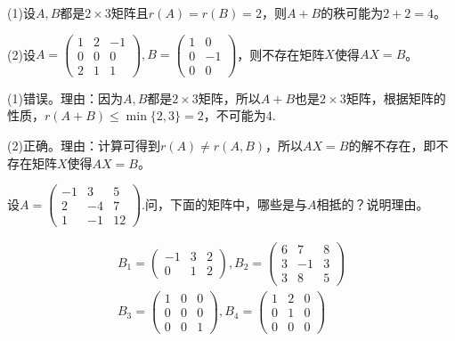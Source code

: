 \documentclass[a4paper]{report}
\begin{document}
(1)设$A,B$都是$2\times3$矩阵且$r(A)=r(B)=2$，则$A+B$的秩可能为$2+2=4$。

(2)设$A=
\begin{pmatrix}
1&2&-1\\
0&0&0\\
2&1&1
\end{pmatrix},B=
\begin{pmatrix}
1&0\\
0&-1\\
0&0
\end{pmatrix}
$，则不存在矩阵$X$使得$AX=B$。

\begin{jie}
(1)错误。理由：因为$A,B$都是$2\times3$矩阵，所以$A+B$也是$2\times3$矩阵，根据矩阵的性质，$r(A+B)\leq \min\{2,3\}=2$，不可能为4.

(2)正确。理由：计算可得到$r(A)\neq r(A,B)$，所以$AX=B$的解不存在，即不存在矩阵$X$使得$AX=B$。
\end{jie}

\EX 设$A=
\begin{pmatrix}
-1&3&5\\
2&-4&7\\
1&-1&12
\end{pmatrix}
$.问，下面的矩阵中，哪些是与$A$相抵的？说明理由。

\begin{gather*}
B_1=
\begin{pmatrix}
-1&3&2\\ 0&1&2
\end{pmatrix},B_2=
\begin{pmatrix}
6&7&8\\
3&-1&3\\
3&8&5
\end{pmatrix}\\
B_3=
\begin{pmatrix}
1&0&0\\ 0&0&0\\ 0&0&1
\end{pmatrix},B_4=
\begin{pmatrix}
1&2&0\\
0&1&0\\
0&0&0
\end{pmatrix}
\end{gather*}
\end{document}
